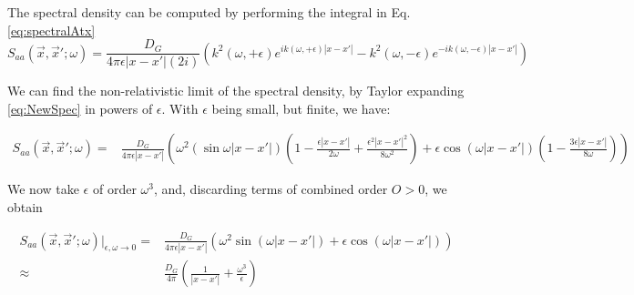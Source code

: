 \documentclass[aps,preprintnumbers,superscriptaddress,longbibliography]{revtex4-1}
\newcommand{\MS}[1]{{\color{blue}#1}}
\begin{document}




The spectral density can be computed by performing the integral in  Eq. \eqref{eq:spectralAtx}
\begin{equation}
     S_{aa}(\vec{x},\vec{x}';\omega)=\frac{D_G}{4\pi \epsilon |x-x'|(2i)}\left(k^2(\omega,+\epsilon)e^{ik(\omega,+\epsilon)|x-x'|}-k^2(\omega,-\epsilon)e^{-ik(\omega,-\epsilon)|x-x'|}\right)
     \label{eq:NewSpec}
\end{equation}


We can find the non-relativistic limit of the spectral density, by Taylor expanding \eqref{eq:NewSpec} in powers of $\epsilon$.
With $\epsilon$ being small, but finite, we have:


\begin{align}
    S_{aa}(\vec{x},\vec{x}';\omega)=&\frac{D_G}{4\pi \epsilon |x-x'|}\left(\omega^2(\sin\omega|x-x'|)(1- \frac{\epsilon|x-x'|}{2\omega}+\frac{\epsilon^2|x-x'|^2}{8\omega^2})+
   \epsilon \cos(\omega|x-x'|)(1-\frac{3\epsilon|x-x'|}{8\omega})\right)
    \nonumber
\end{align}

We now take $\epsilon$  of order $\omega^3$, and, discarding terms of combined order $O>0$, 
we obtain

\begin{align}
\label{eq:nonrel}
     S_{aa}(\vec{x},\vec{x}';\omega)|_{\epsilon, \omega\rightarrow 0}=&\frac{D_G}{4\pi \epsilon |x-x'|}\left(\omega^2 \sin(\omega|x-x'|)+\epsilon\cos(\omega|x-x'|)\right)
     \nonumber\\
     \approx&\frac{D_G}{4\pi}\left(\frac{1}{|x-x'|}+\frac{\omega^3}{\epsilon}\right)
\end{align}
\end{document}
